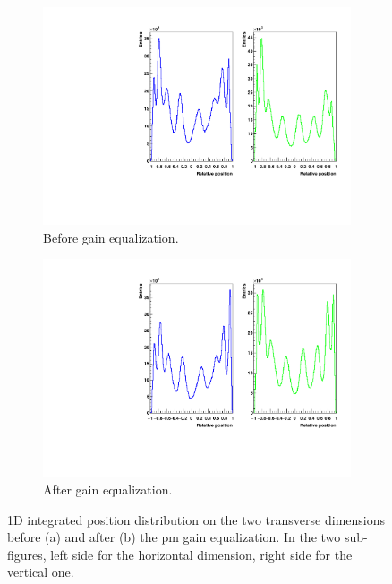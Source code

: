 \begin{figure}
\begin{subfigure}[t]{0.5\textwidth}
\centering
\includegraphics[width=1\textwidth]{03_GraphicFiles/chapter3_CLaRySproto/Absorber/images_charResults_Na22/1_Raw_profileXY_int.pdf}
\caption{Before gain equalization.}
\label{chap3::fig::abssingleAxisRawProfile}
\end{subfigure}
\begin{subfigure}[t]{0.5\textwidth}
\centering
\includegraphics[width=1\textwidth]{03_GraphicFiles/chapter3_CLaRySproto/Absorber/images_charResults_Na22/2_Cal_profileXY_int.pdf}
\caption{After gain equalization.}
\label{chap3::fig::abssingleAxisCalProfile}
\end{subfigure}
\caption{1D integrated position distribution on the two transverse dimensions before (a) and after (b) the \gls{pm} gain equalization. In the two sub-figures, left side for the horizontal dimension, right side for the vertical one.}
\label{chap3::fig::absXYprofiles}
\end{figure}


